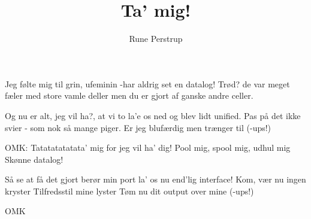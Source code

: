 \documentclass[a4paper,11pt]{article}
\title{Ta' mig!}
\author{Rune Perstrup}
\begin{document}
\twocolumn[
\maketitle
]

\begin{song} 

 Jeg følte mig til grin,
        ufeminin
        -har aldrig set en datalog!
        Trød? de var meget fæler
        med store vamle deller
        men du er gjort af ganske andre celler.

        Og nu er alt, jeg vil ha?,
        at vi to la'e
        os ned og blev lidt unified.
        Pas på det ikke svier
        - som nok så mange piger.
        Er jeg blufærdig men trænger til  (-ups!)

        OMK:
        Tatatatatatata' mig
        for jeg vil ha' dig!
        Pool mig, spool mig, udhul mig
        Skønne datalog!

        Så se at få det gjort
        berør min port
        la' os nu end'lig interface!
        Kom, vær nu ingen kryster
        Tilfredsstil mine lyster
        Tøm nu dit output over mine (-ups!)

        OMK

      \end{song}
    
\end{document}

